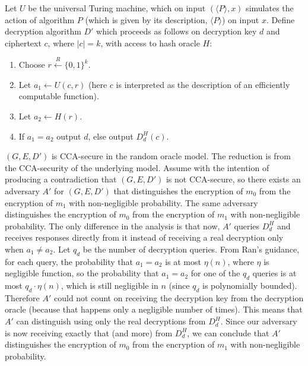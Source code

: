 \documentclass[draft]{article}
\newcommand{\getr}{\overset{R}{\gets}}
\begin{document}
\begin{enumerate}
  Let $U$ be the universal Turing machine, which on input $(\langle P\rangle, x)$ simulates the action of algorithm $P$ (which is given by its description, $\langle P\rangle$) on input $x$.
  Define decryption algorithm $D'$ which proceeds as follows on decryption key $d$ and ciphertext $c$, where $|c|=k$, with access to hash oracle $H$:
  \begin{enumerate}
  \item Choose $r\getr\{0, 1\}^k$.
  \item Let $a_1\gets U(c, r)$ (here $c$ is interpreted as the description of an efficiently computable function).
  \item Let $a_2\gets H(r)$.
  \item If $a_1 = a_2$ output $d$, else output $D_d^H(c)$.
  \end{enumerate}

  $(G, E, D')$ is CCA-secure in the random oracle model.
  The reduction is from the CCA-security of the underlying model.
  Assume with the intention of producing a contradiction that $(G, E, D')$ is not CCA-secure, so there exists an adversary $A'$ for $(G, E, D')$ that distinguishes the encryption of $m_0$ from the encryption of $m_1$ with non-negligible probability.
  The same adversary distinguishes the encryption of $m_0$ from the encryption of $m_1$ with non-negligible probability.
  The only difference in the analysis is that now, $A'$ queries $D_d^H$ and receives responses directly from it instead of receiving a real decryption only when $a_1\neq a_2$.
  Let $q_d$ be the number of decryption queries.
  From Ran's guidance, for each query, the probability that $a_1=a_2$ is at most $\eta(n)$, where $\eta$ is negligible function, so the probability that $a_1 = a_2$ for one of the $q_d$ queries is at most $q_d\cdot \eta(n)$, which is still negligible in $n$ (since $q_d$ is polynomially bounded).
  Therefore $A'$ could not count on receiving the decryption key from the decryption oracle (because that happens only a negligible number of times).
  This means that $A'$ can distinguish using only the real decryptions from $D_d^H$.
  Since our adversary is now receiving exactly that (and more) from $D_d^H$, we can conclude that $A'$ distinguishes the encryption of $m_0$ from the encryption of $m_1$ with non-negligible probability.


\end{enumerate}
\end{document}
